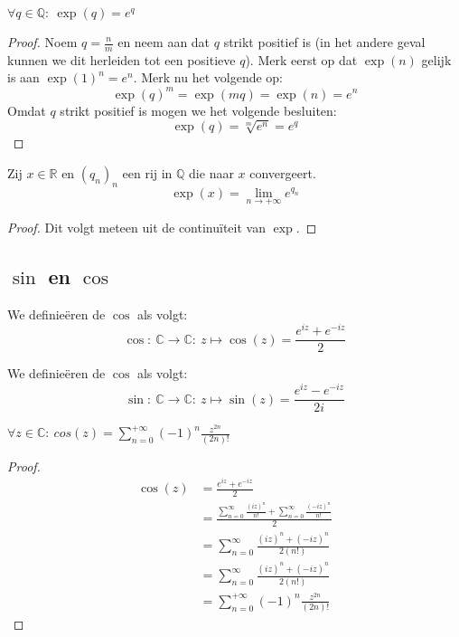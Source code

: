 \documentclass[main.tex]{subfiles}
\begin{document}
\begin{bpr}
  $\forall q \in \mathbb{Q}:\ \exp(q) = e^{q}$

  \begin{proof}
    Noem $q = \frac{n}{m}$ en neem aan dat $q$ strikt positief is (in het andere geval kunnen we dit herleiden tot een positieve $q$).
    Merk eerst op dat $\exp(n)$ gelijk is aan $\exp(1)^{n} = e^{n}$.
    Merk nu het volgende op:
    \[ \exp(q)^{m} = \exp(mq) = \exp(n) = e^{n} \]
    Omdat $q$ strikt positief is mogen we het volgende besluiten: 
    \[ \exp(q) = \sqrt[m]{e^{n}} = e^{q} \]
  \end{proof}
\end{bpr}

\begin{bpr}
  Zij $x\in \mathbb{R}$ en $(q_{n})_{n}$ een rij in $\mathbb{Q}$ die naar $x$ convergeert.
  \[ \exp(x) = \lim_{n\rightarrow +\infty}e^{q_{n}} \]

  \begin{proof}
    Dit volgt meteen uit de continu\"iteit van $\exp$.\needed
  \end{proof}
\end{bpr}

\subsection{$\sin$ en $\cos$}
\label{sec:sin-en-cos}

\begin{de}
  We definie\"eren de  $\cos$ als volgt:
  \[ \cos:\ \mathbb{C} \rightarrow \mathbb{C}:\ z \mapsto \cos(z) = \frac{e^{iz} + e^{-iz}}{2} \]
\end{de}

\begin{de}
  We definie\"eren de  $\cos$ als volgt:
  \[ \sin:\ \mathbb{C} \rightarrow \mathbb{C}:\ z \mapsto \sin(z) = \frac{e^{iz} - e^{-iz}}{2i} \]
\end{de}

\begin{bpr}
  $\forall z \in \mathbb{C}:\ cos(z) = \sum_{n=0}^{+\infty}(-1)^{n}\frac{z^{2n}}{(2n)!}$

  \begin{proof}
    \begin{align*}
      \cos(z)
      &= \frac{e^{iz} + e^{-iz}}{2}\\
      &= \frac{\sum_{n=0}^{\infty}\frac{(iz)^{n}}{n!} + \sum_{n=0}^{\infty}\frac{(-iz)^{n}}{n!}}{2}\\
      &= \sum_{n=0}^{\infty}\frac{(iz)^{n} + (-iz)^{n}}{2(n!)}\\
      &= \sum_{n=0}^{\infty}\frac{(iz)^{n} + (-iz)^{n}}{2(n!)}\\
      &= \sum_{n=0}^{+\infty}(-1)^{n}\frac{z^{2n}}{(2n)!}
    \end{align*}
  \end{proof}
\end{bpr}
\end{document}
